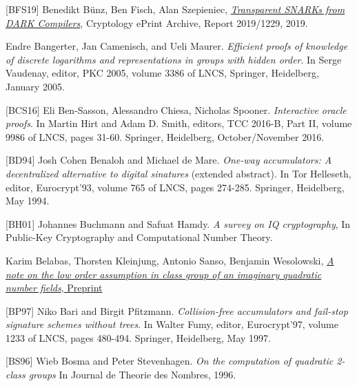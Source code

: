 \documentclass[11pt, lettersize, notitlepage, leqno, footskip=0.6cm]{article}
\newcommand{\noin}{\noindent}
\numberwithin{equation}{section}
\begin{document}
\noindent \hypertarget{BFS19}{[BFS19]} Benedikt B\"{u}nz, Ben Fisch, Alan Szepieniec, \href{https://eprint.iacr.org/2019/1229}{\textit{Transparent SNARKs from DARK Compilers}}, Cryptology ePrint Archive, Report 2019/1229, 2019.  \vspace{0.1cm}

\noin [BCM05] Endre Bangerter, Jan Camenisch, and Ueli Maurer. \textit{Efficient proofs of knowledge of discrete logarithms and representations in groups with hidden order}. In Serge Vaudenay, editor, PKC 2005, volume 3386 of LNCS, Springer, Heidelberg, January 2005.\vspace{0.1cm}

\noin \hypertarget{BCS16}{[BCS16]} Eli Ben-Sasson, Alessandro Chiesa, Nicholas Spooner. \textit{Interactive oracle proofs}. In Martin Hirt and Adam D. Smith, editors, TCC 2016-B, Part II, volume 9986 of LNCS, pages 31-60. Springer, Heidelberg,
October/November 2016.\vspace{0.1cm}

\noin \hypertarget{BD94}{[BD94]} Josh Cohen Benaloh and Michael de Mare. \textit{One-way accumulators: A decentralized alternative to digital sinatures} (extended abstract). In Tor Helleseth, editor, Eurocrypt'93, volume 765 of LNCS, pages 274-285. Springer, Heidelberg, May 1994.\vspace{0.1cm}

\noin \hypertarget{BH01}{[BH01]} Johannes Buchmann and Safuat Hamdy. \textit{A survey on IQ cryptography}, In Public-Key Cryptography and Computational Number Theory. \vspace{0.1cm}

\noin [BKSW20] Karim Belabas, Thorsten Kleinjung, Antonio Sanso, Benjamin Wesolowski, \href{https://eprint.iacr.org/2020/1310}{\textit{A note on the low order assumption in class group of an imaginary quadratic number fields}, Preprint} \vspace{0.1cm}

\noin \hypertarget{BP97}{[BP97]} Niko Bari and Birgit Pfitzmann. \textit{Collision-free accumulators and fail-stop signature schemes without trees}. In Walter Fumy, editor, Eurocrypt'97, volume 1233 of LNCS, pages 480-494. Springer, Heidelberg, May 1997. \vspace{0.1cm}

\noin \hypertarget{BS96}{[BS96]} Wieb Bosma and Peter Stevenhagen. \textit{On the computation of quadratic 2-class groups} In Journal de Theorie des Nombres, 1996. \vspace{0.1cm}
\end{document}
